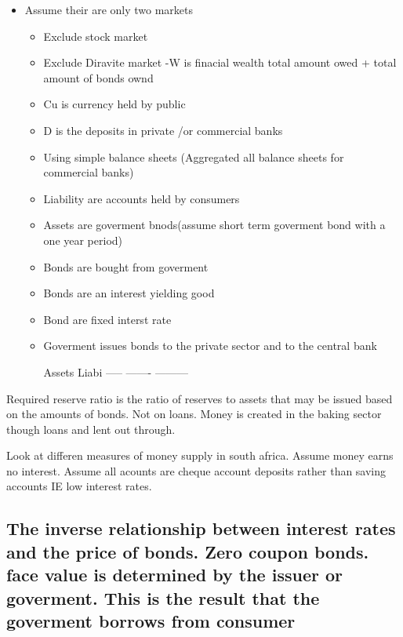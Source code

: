 \documentclass[twocolumn]{article}
\providecommand{\tightlist}{%
  \setlength{\itemsep}{0pt}\setlength{\parskip}{0pt}}
\begin{document}
\begin{itemize}
\tightlist
\item
  Assume their are only two markets

  \begin{itemize}
  \item
    Exclude stock market
  \item
    Exclude Diravite market -W is finacial wealth total amount owed +
    total amount of bonds ownd
  \item
    Cu is currency held by public
  \item
    D is the deposits in private /or commercial banks
  \item
    Using simple balance sheets (Aggregated all balance sheets for
    commercial banks)
  \item
    Liability are accounts held by consumers
  \item
    Assets are goverment bnods(assume short term goverment bond with a
    one year period)
  \item
    Bonds are bought from goverment
  \item
    Bonds are an interest yielding good
  \item
    Bond are fixed interst rate
  \item
    Goverment issues bonds to the private sector and to the central bank

    Assets Liabi ----- ------- ---------
  \end{itemize}
\end{itemize}

Required reserve ratio is the ratio of reserves to assets that may be
issued based on the amounts of bonds. Not on loans. Money is created in
the baking sector though loans and lent out through.

Look at differen measures of money supply in south africa. Assume money
earns no interest. Assume all acounts are cheque account deposits rather
than saving accounts IE low interest rates.

\hypertarget{the-inverse-relationship-between-interest-rates-and-the-price-of-bonds.-zero-coupon-bonds.-face-value-is-determined-by-the-issuer-or-goverment.-this-is-the-result-that-the-goverment-borrows-from-consumer}{%
\subsection{The inverse relationship between interest rates and the
price of bonds. Zero coupon bonds. face value is determined by the
issuer or goverment. This is the result that the goverment borrows from
consumer}\label{the-inverse-relationship-between-interest-rates-and-the-price-of-bonds.-zero-coupon-bonds.-face-value-is-determined-by-the-issuer-or-goverment.-this-is-the-result-that-the-goverment-borrows-from-consumer}}
\end{document}
